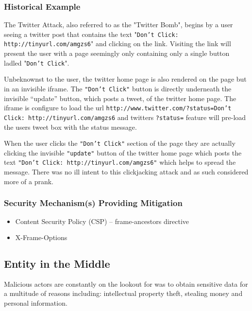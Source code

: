 \documentclass{mscreport}
\begin{document}
\subsubsection{Historical Example}
The Twitter Attack, also referred to as the "Twitter Bomb", begins by a user seeing a twitter post that contains the text "\texttt{Don't Click: http://tinyurl.com/amgzs6}" \cite{Jani2015-kw} and clicking on the link. Visiting the link will present the user with a page seemingly only containing only a single button ladled "\texttt{Don't Click}".

\vspace{0.3cm} \noindent
Unbeknownst to the user, the twitter home page is also rendered on the page but in an invisible iframe. The \texttt{"Don't Click"} button is directly underneath the invisible “update” button, which posts a tweet, of the twitter home page. The iframe is configure to load the url \texttt{http://www.twitter.com/?status=Don't Click: http://tinyurl.com/amgzs6} \cite{Jani2015-kw} and twitters \texttt{?status=} feature will pre-load the users tweet box with the status message.

\vspace{0.3cm} \noindent
When the user clicks the \texttt{"Don't Click"} section of the page they are actually clicking the invisible \texttt{"update"} button of the twitter home page which posts the text \texttt{"Don’t Click: http://tinyurl.com/amgzs6"} \cite{Jani2015-kw} which helps to spread the message. There was no ill intent to this clickjacking attack and as such considered more of a prank.
\subsubsection{Security Mechanism(s) Providing Mitigation}

\begin{itemize}
	\setlength\itemsep{0.1em}
	\item Content Security Policy (CSP) – frame-ancestors directive
	\item X-Frame-Options
\end{itemize}

\subsection{Entity in the Middle}

Malicious actors are constantly on the lookout for was to obtain sensitive data for a multitude of reasons including: intellectual property theft, stealing money and personal information.
\end{document}
